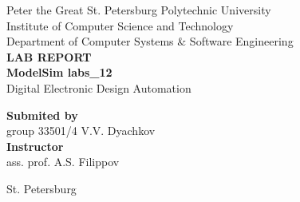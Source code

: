\begin{titlepage}
\begin{center}
	Peter the Great St. Petersburg Polytechnic University\\[0.3cm]
	Institute of Computer Science and Technology\\[0.3cm]
	Department of Computer Systems \& Software Engineering\\[4.5cm]
	
	\textbf{LAB REPORT}\\[0.5cm]
	\textbf{ModelSim labs\_12}\\[0.1cm]
	Digital Electronic Design Automation\\[4.5cm]
\end{center}

\begin{flushright}
	\begin{minipage}{0.4\textwidth}
		\textbf{Submited by}\\[3mm]
		group 33501/4 \hspace*{3mm} V.V. Dyachkov\\[5mm]
		\textbf{Instructor}\\[5mm]
		\sign[1.8cm] \hspace*{0mm} ass. prof. A.S. Filippov\\[5mm]
	\end{minipage}
\end{flushright}

\vfill

\begin{center}
	St. Petersburg\\
	\the\year
\end{center}
\end{titlepage}

\addtocounter{page}{1}
